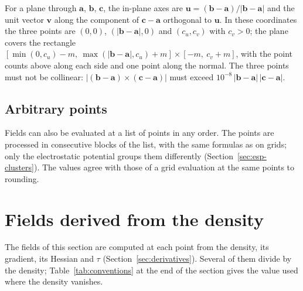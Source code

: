 \documentclass[11pt,a4paper]{article}
\begin{document}
For a plane through $\mathbf a$, $\mathbf b$, $\mathbf c$, the in-plane
axes are $\mathbf u=(\mathbf b-\mathbf a)/|\mathbf b-\mathbf a|$ and the unit
vector $\mathbf v$ along the component of $\mathbf c-\mathbf a$ orthogonal
to $\mathbf u$. In these coordinates the three points are $(0,0)$,
$(|\mathbf b-\mathbf a|,0)$ and $(c_u,c_v)$ with $c_v>0$; the plane covers
the rectangle $[\min(0,c_u)-m,\ \max(|\mathbf b-\mathbf a|,c_u)+m]\times
[-m,\ c_v+m]$, with the point counts above along each side and one point
along the normal. The three points must not be collinear:
$|(\mathbf b-\mathbf a)\times(\mathbf c-\mathbf a)|$ must exceed
$10^{-8}\,|\mathbf b-\mathbf a|\,|\mathbf c-\mathbf a|$.

\subsection{Arbitrary points}
Fields can also be evaluated at a list of points in any order. The points
are processed in consecutive blocks of the list, with the same formulas as
on grids; only the electrostatic potential groups them differently
(Section~\ref{sec:esp-clusters}). The values agree with those of a grid
evaluation at the same points to rounding.

\section{Fields derived from the density}\label{sec:descriptors}

The fields of this section are computed at each point from the density,
its gradient, its Hessian and $\tau$ (Section~\ref{sec:derivatives}).
Several of them divide by the density; Table~\ref{tab:conventions} at the
end of the section gives the value used where the density vanishes.
\end{document}
